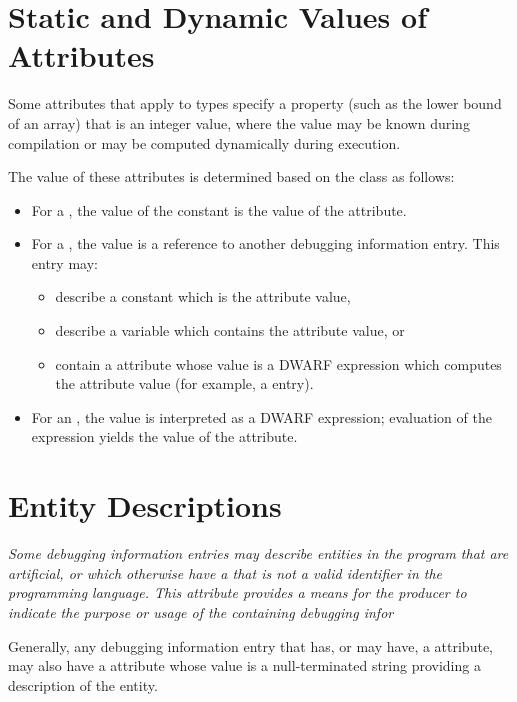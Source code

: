 \section{Static and Dynamic Values of Attributes}
\label{chap:staticanddynamicvaluesofattributes}

Some attributes that apply to types specify a property (such
as the lower bound of an array) that is an integer value,
where the value may be known during compilation or may be
computed dynamically during execution.

The value of these
attributes is determined based on the class as follows:
\begin{itemize}
\item For a , the value 
of the constant is the value of the attribute.

\item For a , the
value is a reference to another debugging information entry.  
This entry may:
\begin{itemize}
\renewcommand{\itemsep}{0cm}
\item describe a constant which is the attribute value,
\item describe a variable which contains the attribute value, or
\item contain a \DWATlocation{} attribute whose value is a
      DWARF expression which computes the attribute value
      (for example, a \DWTAGdwarfprocedure{} entry).
\end{itemize}

\item For an , the value 
is interpreted as a DWARF expression; evaluation of the expression 
yields the value of the attribute.
\end{itemize}


\section{Entity Descriptions}
\textit{Some debugging information entries may describe entities
in the program that are artificial, or which otherwise have a 
 that is not a valid identifier in the
programming language. 
This attribute provides a means for the producer to indicate
the purpose or usage of the containing debugging infor}

Generally, any debugging information entry that 
has,\hypertarget{chap:DWATdescriptionartificialnameordescription}{}
or may have, a \DWATname{} attribute, may also have a
\DWATdescriptionDEFN{} attribute whose value is a
null-terminated string providing a description of the entity.

